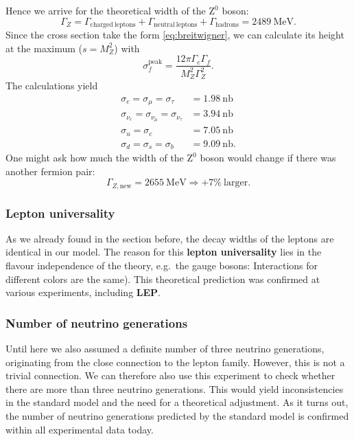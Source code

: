 Hence we arrive for the theoretical width of the $\mathrm{Z^0}$ boson:
\begin{equation*}
    \Gamma_Z = \Gamma_{\mathrm{charged \: leptons}} + \Gamma_{\mathrm{neutral \: leptons}}  + \Gamma_{\mathrm{hadrons}} = 2489 \: \mathrm{MeV} .
\end{equation*}
Since the cross section take the form \eqref{eq:breitwigner}, we can calculate its height at the maximum ($s = M_Z^2$) with
\begin{equation*}
    \sigma_f^{\mathrm{peak}} = \frac{12\pi \Gamma_e \Gamma_f }{M_Z^2 \Gamma_Z^2} .
\end{equation*}
The calculations yield
\begin{align*}
     \label{eq:peaks}
     \sigma_e = \sigma_\mu = \sigma_\tau &= 1.98 \: \mathrm{nb} \\
     \sigma_{\nu_e} = \sigma_{\nu_\mu} = \sigma_{\nu_\tau} &= 3.94 \: \mathrm{nb} \\
     \sigma_u = \sigma_c &= 7.05 \: \mathrm{nb} \\
     \sigma_d = \sigma_s = \sigma_b &= 9.09\: \mathrm{nb} .
\end{align*}
 One might ask how much the width of the $\mathrm{Z^0}$ boson would change if there was another fermion pair:
 \begin{equation*}
 \Gamma_{Z, \mathrm{new}} = 2655 \: \mathrm{MeV} \Rightarrow +7\% \: \text{larger}.
 \end{equation*}
\subsubsection{Lepton universality}
\label{sub:lepton_universality}
As we already found in the section before, the decay widths of the leptons are identical in our model. The reason for this
\textbf{lepton universality} lies in the flavour independence of the theory, e.g.\ the gauge bosons: Interactions for 
different colors are the same).
This theoretical prediction was confirmed at various experiments, including \textbf{LEP}.

\subsubsection{Number of neutrino generations}
\label{sub:number_of_neutrino_generations}
Until here we also assumed a definite number of three neutrino generations, originating from the close connection to the
lepton family. However, this is not a trivial connection. We can therefore also use this experiment to check whether there are
more than three neutrino generations. This would yield inconsistencies in the standard model and the need for a theoretical
adjustment. As it turns out, the number of neutrino generations predicted by the standard model is confirmed within all 
experimental data today.


